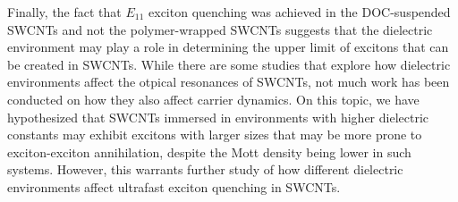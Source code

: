  Finally, the fact that $E_{11}$ exciton quenching was achieved in the DOC-suspended SWCNTs and not the polymer-wrapped SWCNTs suggests that the dielectric environment may play a role in determining the upper limit of excitons that can be created in SWCNTs. While there are some studies that explore how dielectric environments affect the otpical resonances of SWCNTs, not much work has been conducted on how they also affect carrier dynamics. On this topic, we have hypothesized that SWCNTs immersed in environments with higher dielectric constants may exhibit excitons with larger sizes that may be more prone to exciton-exciton annihilation, despite the Mott density being lower in such systems. However, this warrants further study of how different dielectric environments affect ultrafast exciton quenching in SWCNTs.

